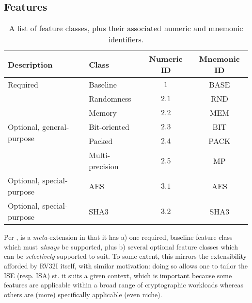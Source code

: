 
\subsection{Features}
\label{sec:bg:feature}

\begin{table}[t]
\begin{center}
\begin{tabular}{|l|l|cc|}
\hline
Description                                & Class           & Numeric ID & Mnemonic ID \\
\hline\hline
\multirow{1}{*}{Required                 } & Baseline        & $1$        & BASE        \\
\hline
\multirow{5}{*}{Optional, general-purpose} & Randomness      & $2.1$      & RND         \\
                                           & Memory          & $2.2$      & MEM         \\
                                           & Bit-oriented    & $2.3$      & BIT         \\
                                           & Packed          & $2.4$      & PACK        \\
                                           & Multi-precision & $2.5$      & MP          \\
\hline
\multirow{1}{*}{Optional, special-purpose} & AES             & $3.1$      & AES         \\
\multirow{1}{*}{Optional, special-purpose} & SHA3            & $3.2$      & SHA3        \\
\hline
\end{tabular}
\end{center}
\caption{A list of feature classes, plus their associated numeric and mnemonic identifiers.}
\label{tab:feature}
\end{table}

Per , \XCID is a {\em meta}-extension in that it has 
a) one     required, baseline feature class
   which must {\em always} be supported,
   plus
b) several optional           feature classes
   which can be {\em selectively} supported to suit.
To some extent, this mirrors the extensibility afforded by RV32I itself, 
with similar motivation: doing so allows one to tailor the ISE (resp. ISA) 
st. it suits a given context, which is important because some features are 
applicable within a broad range of cryptographic workloads whereas others 
are (more) specifically applicable (even niche).

